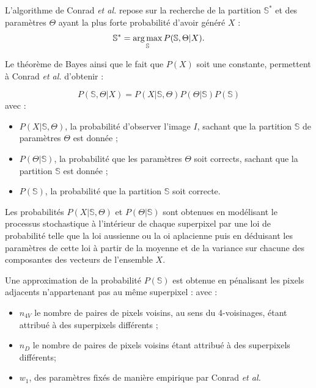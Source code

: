 L'algorithme de Conrad \textit{et al.} \cite{conrad2013contour} repose sur la recherche de la partition $\mathbb{S}^{*}$ et des paramètres $\Theta$ ayant la plus forte probabilité d'avoir généré $X$ :
\begin{equation}
\mathbb{S}^{*} = \operatorname*{arg\,max}_{\mathbb{S}} P(\mathbb{S}, \Theta | X) \text{.}
\end{equation}

Le théorème de Bayes ainsi que le fait que $P(X)$ soit une constante, permettent à Conrad \textit{et al.} d'obtenir :

\begin{equation}
P(\mathbb{S}, \Theta | X) = P(X|\mathbb{S},\Theta) P(\Theta | \mathbb{S}) P(\mathbb{S}) 
\end{equation}
avec :
\begin{itemize}
\item $P(X|\mathbb{S},\Theta)$, la probabilité d'observer l'image $I$, sachant que la partition $\mathbb{S}$ de paramètres $\Theta$ est donnée ;
\item $P(\Theta | \mathbb{S})$, la probabilité que les paramètres $\Theta$ soit corrects, sachant que la partition $\mathbb{S}$ est donnée ;
\item $P(\mathbb{S})$, la probabilité que la partition $\mathbb{S}$ soit correcte. 
\end{itemize}

Les probabilités $P(X|\mathbb{S},\Theta)$ et $P(\Theta | \mathbb{S})$ sont obtenues en modélisant le processus stochastique à l'intérieur de chaque superpixel par une loi de probabilité telle que la loi aussienne ou la oi aplacienne puis en déduisant les paramètres de cette loi à partir de la moyenne et de la variance sur chacune des composantes des vecteurs de l'ensemble $X$. 

Une approximation de la probabilité $P(\mathbb{S})$ est obtenue en pénalisant les pixels adjacents n'appartenant pas au même superpixel : 
avec : 
\begin{itemize}
\item $n_{4V}$ le nombre de paires de pixels voisins, au sens du 4-voisinages, étant attribué à des superpixels différents ;
\item $n_{D}$ le nombre de paires de pixels voisins  étant attribué à des superpixels différents; 
\item $w_{1}$,  des paramètres fixés de manière empirique par Conrad \textit{et al.}
\end{itemize}

